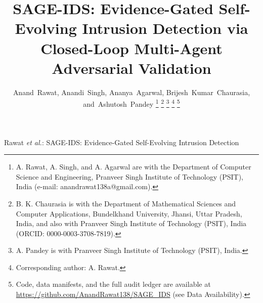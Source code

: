 \documentclass[journal]{IEEEtran}
\newcommand{\sage}{SAGE-IDS}
\begin{document}
\title{\sage{}: Evidence-Gated Self-Evolving Intrusion Detection via\\
Closed-Loop Multi-Agent Adversarial Validation}

\author{Anand~Rawat,
        Anandi~Singh,
        Ananya~Agarwal,
        Brijesh~Kumar~Chaurasia,
        and~Ashutosh~Pandey%
\thanks{A. Rawat, A. Singh, and A. Agarwal are with the Department of Computer Science and
Engineering, Pranveer Singh Institute of Technology (PSIT), India
(e-mail: anandrawat138a@gmail.com).}%
\thanks{B. K. Chaurasia is with the Department of Mathematical Sciences and Computer Applications,
Bundelkhand University, Jhansi, Uttar Pradesh, India, and also with Pranveer Singh Institute of
Technology (PSIT), India (ORCID: 0000-0003-3708-7819).}%
\thanks{A. Pandey is with Pranveer Singh Institute of Technology (PSIT), India.}%
\thanks{Corresponding author: A. Rawat.}%
\thanks{Code, data manifests, and the full audit ledger are available at
\url{https://github.com/AnandRawat138/SAGE_IDS} (see Data Availability).}}

%
{Rawat \MakeLowercase{\textit{et al.}}: \sage{}: Evidence-Gated Self-Evolving Intrusion Detection}

\maketitle
\end{document}
